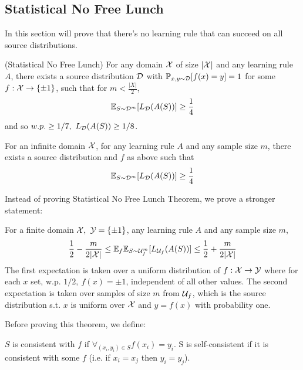 \documentclass{article}
\begin{document}
\subsection{Statistical No Free Lunch}
In this section will prove that there's no learning rule that can succeed on all source distributions.
\begin{theorem}(Statistical No Free Lunch)
	For any domain $\mathcal{X}$ of size $|\mathcal{X}|$ and any learning rule $A$, there exists a source distribution $\mathcal{D}$ with $\mathbb{P}_{x,y\sim\mathcal{D}}[f(x)=y]=1$ for some $f:\mathcal{X}\rightarrow\{\pm1\}$, such that for $m<\frac{|X|}{2}$,
	 \begin{displaymath}
  		\mathbb{E}_{S\sim\mathcal{D}^m}[L_{\mathcal{D}}(A(S))]\geq \frac{1}{4}
	\end{displaymath}
	and so $w.p.\geq1/7,\ L_\mcD(A(S))\geq1/8$.
	
	For an infinite domain $\mathcal{X}$, for any learning rule $A$ and any sample size $m$, there exists a source distribution and $f$ as above such that
	\begin{displaymath}
  		\mathbb{E}_{S\sim\mathcal{D}^m}[L_{\mathcal{D}}(A(S))]\geq \frac{1}{4}
	\end{displaymath}
\end{theorem}
Instead of proving Statistical No Free Lunch Theorem, we prove a stronger statement:
\begin{theorem}
	For a finite domain $\mcX,\ \mcY=\{\pm1\}$, any learning rule $A$ and any sample size $m$, 
	\begin{displaymath}
  		\frac{1}{2}-\frac{m}{2|\mathcal{X}|}\leq \mathbb{E}_f\mathbb{E}_{S\sim \mathcal{U}^m_f}[L_{\mathcal{U}_f}(A(S))]\leq \frac{1}{2}+\frac{m}{2|\mathcal{X}|}
	\end{displaymath}
	The first expectation is taken over a uniform distribution of $f:\mathcal{X}\rightarrow\mathcal{Y}$ where for each $x$ set, w.p. $1/2 ,\ f(x)=\pm1$, independent of all other values. The second expectation is taken over samples of size $m$ from $\mathcal{U}_f$, which is the source distribution s.t. $x$ is uniform over $\mathcal{X}$ and $y=f(x)$ with probability one.
\end{theorem}
Before proving this theorem, we define:
\begin{defn}
	$S$ is consistent with $f$ if $\forall_{(x_i,y_i)\in S}f(x_i)=y_i$. S is self-consistent if it is consistent with some $f$ (i.e. if $x_i=x_j$ then $y_i=y_j$).
\end{defn}
\end{document}
